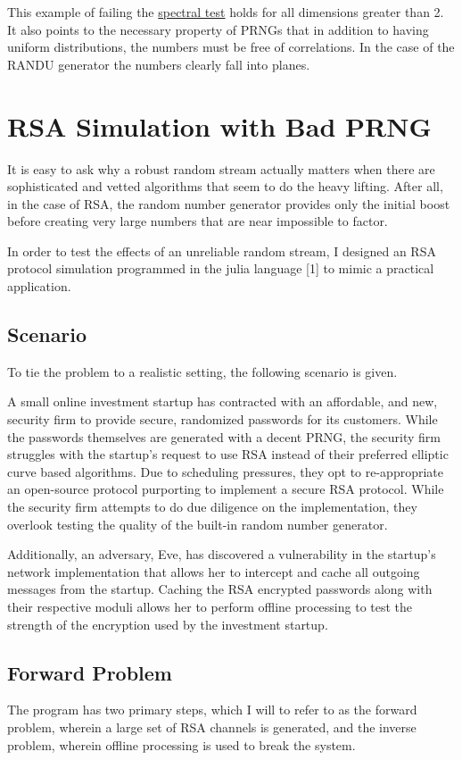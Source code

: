\documentclass[conference]{/Users/paul/MSEE/ee595/project/report/IEEEtran/IEEEtran}
\begin{document}
This example of failing the \href{https://en.wikipedia.org/wiki/Spectral_test}{spectral test} holds for all dimensions greater than 2. It also points to the necessary property of PRNGs that in addition to having uniform distributions, the numbers must be free of correlations. In the case of the RANDU generator the numbers clearly fall into planes. 

\section{RSA Simulation with Bad PRNG}
It is easy to ask why a robust random stream actually matters when there are sophisticated and vetted algorithms that seem to do the heavy lifting. After all, in the case of RSA, the random number generator provides only the initial boost before creating very large numbers that are near impossible to factor. 

    In order to test the effects of an unreliable random stream, I designed an RSA protocol simulation programmed in the julia language [1] to mimic a practical application. 

\subsection{Scenario}
To tie the problem to a realistic setting, the following scenario is given.
 
    A small online investment startup has contracted with an affordable, and new, security firm to provide secure, randomized passwords for its customers. While the passwords themselves are generated with a decent PRNG, the security firm struggles with the startup's request to use RSA instead of their preferred elliptic curve based algorithms. Due to scheduling pressures, they opt to re-appropriate an open-source protocol purporting to implement a secure
RSA protocol. While the security firm attempts to do due diligence on the implementation, they overlook testing the quality of the built-in random number generator. 

    Additionally, an adversary, Eve, has discovered a vulnerability in the startup's network implementation that allows her to intercept and cache all outgoing messages from the startup. Caching the RSA encrypted passwords along with their respective moduli allows her to perform offline processing to test the strength of the encryption used by the investment startup. 

\subsection{Forward Problem}
The program has two primary steps, which I will to refer to as the forward problem, wherein a large set of RSA channels is generated, and the inverse problem, wherein offline processing is used to break the system. 
\end{document}

